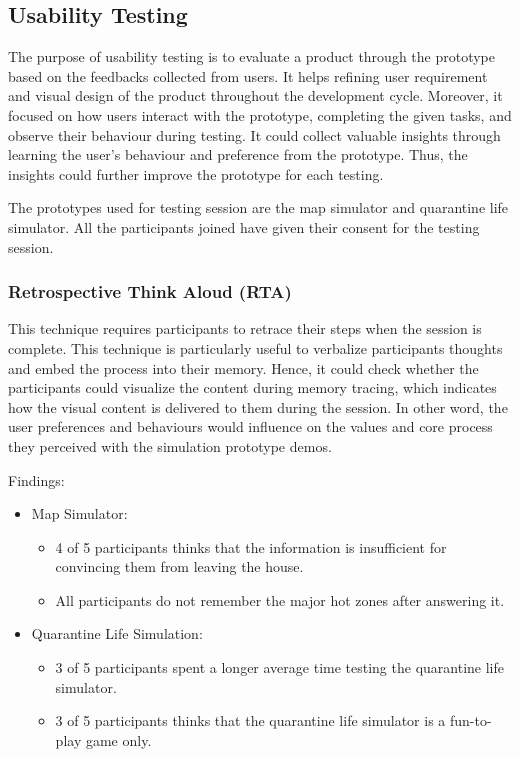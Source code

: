   \subsection{Usability Testing}
    \par The purpose of usability testing is to evaluate a product through the prototype based on the feedbacks collected from users. It helps refining user requirement and visual design of the product throughout the development cycle. Moreover, it focused on how users interact with the prototype, completing the given tasks, and observe their behaviour during testing. It could collect valuable insights through learning the user’s behaviour and preference from the prototype. Thus, the insights could further improve the prototype for each testing.
    \par The prototypes used for testing session are the map simulator and quarantine life simulator. All the participants joined have given their consent for the testing session.
    
    \subsubsection{Retrospective Think Aloud (RTA)}
      \par This technique requires participants to retrace their steps when the session is complete. This technique is particularly useful to verbalize participants thoughts and embed the process into their memory. Hence, it could check whether the participants could visualize the content during memory tracing, which indicates how the visual content is delivered to them during the session. In other word, the user preferences and behaviours would influence on the values and core process they perceived with the simulation prototype demos.
      \par Findings:
      \begin{itemize}
        \item Map Simulator:
          \begin{itemize}
            \item 4 of 5 participants thinks that the information is insufficient for convincing them from leaving the house.
            \item All participants do not remember the major hot zones after answering it.
          \end{itemize}
        \item Quarantine Life Simulation:
          \begin{itemize}
            \item 3 of 5 participants spent a longer average time testing the quarantine life simulator.
            \item 3 of 5 participants thinks that the quarantine life simulator is a fun-to-play game only.
          \end{itemize}
      \end{itemize}
    
